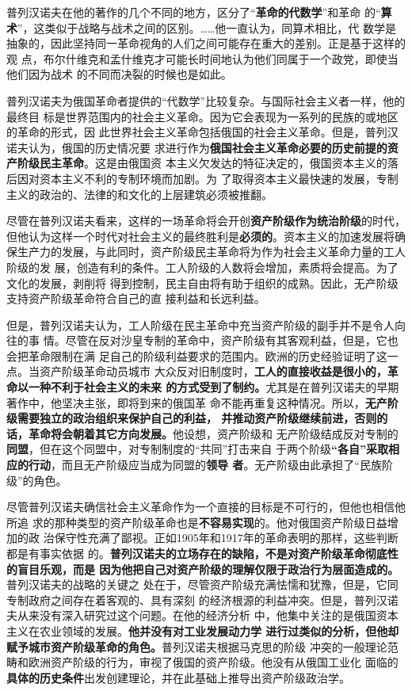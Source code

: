 普列汉诺夫在他的著作的几个不同的地方，区分了“\textbf{革命的代数学}”和革命
的“\textbf{算术}”，这类似于战略与战术之间的区别。……他一直认为，同算术相比，代
数学是抽象的，因此坚持同一革命视角的人们之间可能存在重大的差别。正是基于这样的观
点，布尔什维克和孟什维克才可能长时间地认为他们同属于一个政党，即使当他们因为战术
的不同而决裂的时候也是如此。

普列汉诺夫为俄国革命者提供的“代数学”比较复杂。与国际社会主义者一样，他的最终目
标是世界范围内的社会主义革命。因为它会表现为一系列的民族的或地区的革命的形式，因
此世界社会主义革命包括俄国的社会主义革命。但是，普列汉诺夫认为，俄国的历史情况要
求进行作为\textbf{俄国社会主义革命必要的历史前提的资产阶级民主革命}。这是由俄国资
本主义欠发达的特征决定的，俄国资本主义的落后因对资本主义不利的专制环境而加剧。为
了取得资本主义最快速的发展，专制主义的政治的、法律的和文化的上层建筑必须被推翻。

尽管在普列汉诺夫看来，这样的一场革命将会开创\textbf{资产阶级作为统治阶级}的时代，
但他认为这样一个时代对社会主义的最终胜利是\textbf{必须的}。资本主义的加速发展将确
保生产力的发展，与此同时，资产阶级民主革命将为作为社会主义革命力量的工人阶级的发
展，创造有利的条件。工人阶级的人数将会增加，素质将会提高。为了文化的发展，剥削将
得到控制，民主自由将有助于组织的成熟。因此，无产阶级支持资产阶级革命符合自己的直
接利益和长远利益。

但是，普列汉诺夫认为，工人阶级在民主革命中充当资产阶级的副手并不是令人向往的事
情。尽管在反对沙皇专制的革命中，资产阶级有其客观利益，但是，它也会把革命限制在满
足自己的阶级利益要求的范围内。欧洲的历史经验证明了这一点。当资产阶级革命动员城市
大众反对旧制度时，\textbf{工人的直接收益是很小的，革命以一种不利于社会主义的未来
  的方式受到了制约。}尤其是在普列汉诺夫的早期著作中，他坚决主张，即将到来的俄国革
命不能再重复这种情况。所以，\textbf{无产阶级需要独立的政治组织来保护自己的利益，
  并推动资产阶级继续前进，否则的话，革命将会朝着其它方向发展。}他设想，资产阶级和
无产阶级结成反对专制的\textbf{同盟}，但在这个同盟中，对专制制度的“共同”打击来自
于两个阶级\textbf{“各自”采取相应的行动}，而且无产阶级应当成为同盟的\textbf{领导
  者}。无产阶级由此承担了“民族阶级”的角色。

尽管普列汉诺夫确信社会主义革命作为一个直接的目标是不可行的，但他也相信他所追
求的那种类型的资产阶级革命也是\textbf{不容易实现}的。他对俄国资产阶级日益增加的政
治保守性充满了鄙视。正如1905年和1917年的革命表明的那样，这些判断都是有事实依据
的。\textbf{普列汉诺夫的立场存在的缺陷，不是对资产阶级革命彻底性的盲目乐观，而是
  因为他把自己对资产阶级的理解仅限于政治行为层面造成的。}普列汉诺夫的战略的关键之
处在于，尽管资产阶级充满怯懦和犹豫，但是，它同专制政府之间存在着客观的、具有深刻
的经济根源的利益冲突。但是，普列汉诺夫从来没有深入研究过这个问题。在他的经济分析
中，他集中关注的是俄国资本主义在农业领域的发展。\textbf{他并没有对工业发展动力学
  进行过类似的分析，但他却赋予城市资产阶级革命的角色。}普列汉诺夫根据马克思的阶级
冲突的一般理论范畴和欧洲资产阶级的行为，审视了俄国的资产阶级。他没有从俄国工业化
面临的\textbf{具体的历史条件}出发创建理论，并在此基础上推导出资产阶级政治学。


